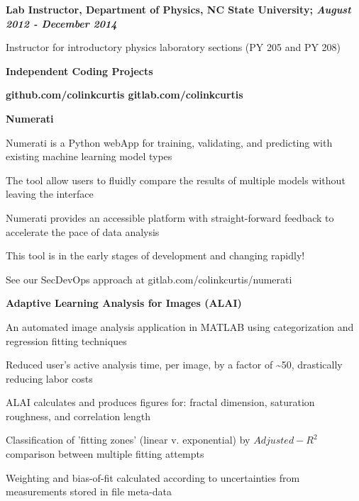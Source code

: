 \documentclass[letterpaper,final]{memoir}
\newcommand{\LargeSep}{\vspace{1.3em}}
\newcommand{\Sep}{\vspace{1.0em}}
\newcommand{\SmallSep}{\vspace{0.4em}}
\newcommand{\CVSection}[1]
	{\LARGE\textbf{#1}\par
	\SmallSep\normalsize}
\newcommand{\CVItem}[1]
	{\textbf{\color{Blue} #1}}
\newcommand\tab[1][1cm]{\hspace*{#1}}
\begin{document}
\Sep

\CVItem{Lab Instructor, Department of Physics, NC State University; \textit{August 2012 - December 2014}}
\begin{compactitem}[\color{Blue}$\circ$]

    \SmallSep
    \item Instructor for introductory physics laboratory sections (PY 205 and PY 208)
\end{compactitem}

\LargeSep

\newpage


\notoserif \CVSection{Independent Coding Projects}
\SmallSep

\normalfont
\CVItem{github.com/colinkcurtis \tab gitlab.com/colinkcurtis}
\LargeSep

\CVItem{Numerati}
\SmallSep
\begin{compactitem}[\color{Blue}$\circ$]

    \item Numerati is a Python webApp for training, validating, and predicting with existing machine learning model types
    \SmallSep
    \item The tool allow users to fluidly compare the results of multiple models without leaving the interface
    \SmallSep
    \item Numerati provides an accessible platform with straight-forward feedback to accelerate the pace of data analysis
    \SmallSep
    \item This tool is in the early stages of development and changing rapidly!
    \SmallSep
    \item See our SecDevOps approach at gitlab.com/colinkcurtis/numerati

\end{compactitem}
\Sep

\CVItem{Adaptive Learning Analysis for Images (ALAI)}
\SmallSep
\begin{compactitem}[\color{Blue}$\circ$]
    \item An automated image analysis application in MATLAB using categorization and regression fitting techniques
    \SmallSep
    \item Reduced user's active analysis time, per image, by a factor of \textasciitilde 50, drastically reducing labor costs
    \SmallSep
    \item ALAI calculates and produces figures for: fractal dimension, saturation roughness, and correlation length
    \SmallSep
    \item Classification of 'fitting zones' (linear v. exponential) by $Adjusted-R^2$ comparison between multiple fitting attempts
    \SmallSep
    \item Weighting and bias-of-fit calculated according to uncertainties from measurements stored in file meta-data
\end{compactitem}
\LargeSep
\end{document}
